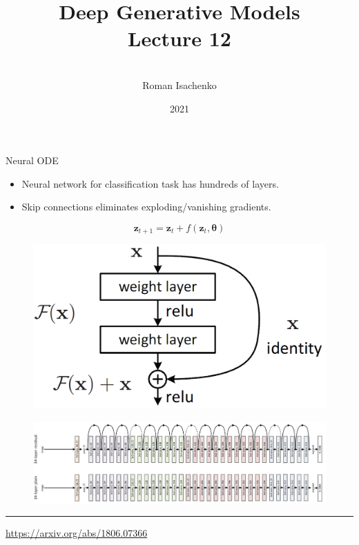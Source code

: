 \documentclass{beamer}
\title[\hbox to 56mm{Deep Generative Models  \hfill\insertframenumber\,/\,\inserttotalframenumber}]
{Deep Generative Models \\ Lecture 12}
\author[Roman Isachenko]{\\Roman Isachenko}
\institute[Ozon]{Ozon Masters \\
}
\date{2021}
\newcommand{\bz}{\mathbf{z}}
\newcommand{\btheta}{\boldsymbol{\theta}}
\begin{document}
\begin{frame}
\titlepage
\end{frame}
\begin{frame}{Neural ODE}
\begin{minipage}[t]{0.6\columnwidth}
\vspace{0.2cm}
\begin{itemize}
	\item Neural network for classification task has hundreds of layers.
	\item Skip connections eliminates exploding/vanishing gradients.
\end{itemize}
\[
	\bz_{t + 1} = \bz_t + f(\bz_t, \btheta)
\]
\end{minipage}%
\begin{minipage}[t]{0.4\columnwidth}
\begin{figure}
    \centering
    \includegraphics[width=0.95\linewidth]{figs/resnet_1.png}
\end{figure}
\end{minipage}
\begin{figure}
    \centering
    \includegraphics[width=\linewidth]{figs/resnet_2.png}
\end{figure}
\vfill
\hrule\medskip
{\scriptsize \href{https://arxiv.org/abs/1806.07366}{https://arxiv.org/abs/1806.07366}}   
\end{frame}
\end{document}
